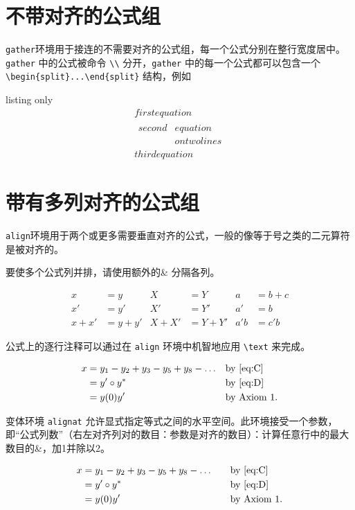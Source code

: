 \documentclass[openany]{ctexbook}
\begin{document}
\section{不带对齐的公式组}
\verb|gather|环境用于接连的不需要对齐的公式组，每一个公式分别在整行宽度居中。\verb|gather| 中的公式被命令 \verb|\\| 分开，\verb|gather| 中的每一个公式都可以包含一个 \verb|\begin{split}...\end{split}| 结构，例如
\begin{tcblisting}{listing only}
\begin{gather}
first equation\\
\begin{split}
second & equation\\
       & on two lines
\end{split}\\
third equation
\end{gather}
\end{tcblisting}

\section{带有多列对齐的公式组}
\verb|align|环境用于两个或更多需要垂直对齐的公式，一般的像等于号之类的二元算符是被对齐的。

要使多个公式列并排，请使用额外的\& 分隔各列。
\begin{tcblisting}{}
\begin{align}
x&=y          & X&=Y         & a&=b+c\label{eq:C}\\
x'&=y'        & X'&=Y'       & a'&=b\label{eq:D}\\
x+x'&=y+y'    & X+X'&=Y+Y'   & a'b&=c'b
\end{align}
\end{tcblisting}

公式上的逐行注释可以通过在 \verb|align| 环境中机智地应用 \verb|\text| 来完成。
\begin{tcblisting}{}
\begin{align}
x& = y_1-y_2+y_3-y_5+y_8-\dots
                     && \text{by \eqref{eq:C}}\\
 & = y'\circ y^*     && \text{by \eqref{eq:D}}\\
 & = y(0) y'         && \text {by Axiom 1.}
\end{align}
\end{tcblisting}

变体环境 \verb|alignat| 允许显式指定等式之间的水平空间。此环境接受一个参数，即“公式列数”（右左对齐列对的数目：参数是对齐的数目）：计算任意行中的最大数目的\&，加1并除以2。
\begin{tcblisting}{}
\begin{alignat}{2}
x& = y_1-y_2+y_3-y_5+y_8-\dots
                     &\quad& \text{by \eqref{eq:C}}\\
 & = y'\circ y^*     && \text{by \eqref{eq:D}}\\
 & = y(0) y'         && \text {by Axiom 1.}
\end{alignat}
\end{tcblisting}
\end{document}

